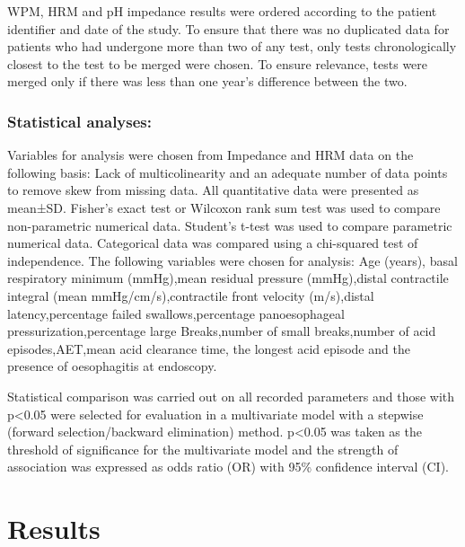 \documentclass[english,man,floatsintext]{apa6}
\begin{document}
WPM, HRM and pH impedance results were ordered according to the patient identifier and date of the study. To ensure that there was no duplicated data for patients who had undergone more than two of any test, only tests chronologically closest to the test to be merged were chosen. To ensure relevance, tests were merged only if there was less than one year's difference between the two.

\hypertarget{statistical-analyses}{%
\subsubsection{Statistical analyses:}\label{statistical-analyses}}

Variables for analysis were chosen from Impedance and HRM data on the following basis: Lack of multicolinearity and an adequate number of data points to remove skew from missing data. All quantitative data were presented as mean±SD. Fisher's exact test or Wilcoxon rank sum test was used to compare non-parametric numerical data. Student's t-test was used to compare parametric numerical data. Categorical data was compared using a chi-squared test of independence. The following variables were chosen for analysis: Age (years), basal respiratory minimum (mmHg),mean residual pressure (mmHg),distal contractile integral (mean mmHg/cm/s),contractile front velocity (m/s),distal latency,percentage failed swallows,percentage panoesophageal pressurization,percentage large Breaks,number of small breaks,number of acid episodes,AET,mean acid clearance time, the longest acid episode and the presence of oesophagitis at endoscopy.

Statistical comparison was carried out on all recorded parameters and those with p\textless{}0.05 were selected for evaluation in a multivariate model with a stepwise (forward selection/backward elimination) method. p\textless{}0.05 was taken as the threshold of significance for the multivariate model and the strength of association was expressed as odds ratio (OR) with 95\% confidence interval (CI).

\hypertarget{results}{%
\section{Results}\label{results}}
\end{document}
